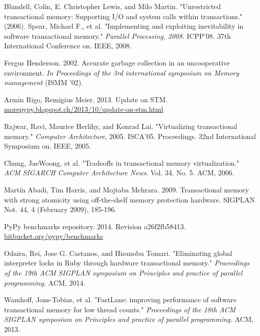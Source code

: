\documentclass{sigplanconf}
\begin{document}
\begin{thebibliography}{}
 Blundell, Colin, E. Christopher Lewis, and Milo
  Martin. "Unrestricted transactional memory: Supporting I/O and system
  calls within transactions." (2006).
 Spear, Michael F., et al. "Implementing and
  exploiting inevitability in software transactional memory."
  \emph{Parallel Processing, 2008}. ICPP'08. 37th International
  Conference on. IEEE, 2008.

 Fergus Henderson. 2002. Accurate garbage collection
  in an uncooperative environment. \emph{In Proceedings of the 3rd
    international symposium on Memory management} (ISMM '02).

 Armin Rigo, Remigius Meier. 2013. Update on
  STM. \url{morepypy.blogspot.ch/2013/10/update-on-stm.html}

 Rajwar, Ravi, Maurice Herlihy, and Konrad
  Lai. "Virtualizing transactional memory." \emph{Computer
    Architecture}, 2005. ISCA'05. Proceedings. 32nd International
  Symposium on. IEEE, 2005.

 Chung, JaeWoong, et al. "Tradeoffs in transactional
  memory virtualization." \emph{ACM SIGARCH Computer Architecture
  News}. Vol. 34. No. 5. ACM, 2006.

 Martín Abadi, Tim Harris, and Mojtaba
  Mehrara. 2009. Transactional memory with strong atomicity using
  off-the-shelf memory protection hardware. SIGPLAN Not. 44, 4 (February
  2009), 185-196.

 PyPy benchmarks repository. 2014. Revision
  a26f2fb58413. \url{bitbucket.org/pypy/benchmarks}





  Odaira, Rei, Jose G. Castanos, and Hisanobu Tomari.  "Eliminating
  global interpreter locks in Ruby through hardware transactional
  memory."  \emph{Proceedings of the 19th ACM SIGPLAN symposium on
    Principles and practice of parallel programming.} ACM, 2014.

  Wamhoff, Jons-Tobias, et al. "FastLane: improving performance of
  software transactional memory for low thread counts."
  \emph{Proceedings of the 18th ACM SIGPLAN symposium on Principles
    and practice of parallel programming.} ACM, 2013.


\end{thebibliography}
\end{document}
